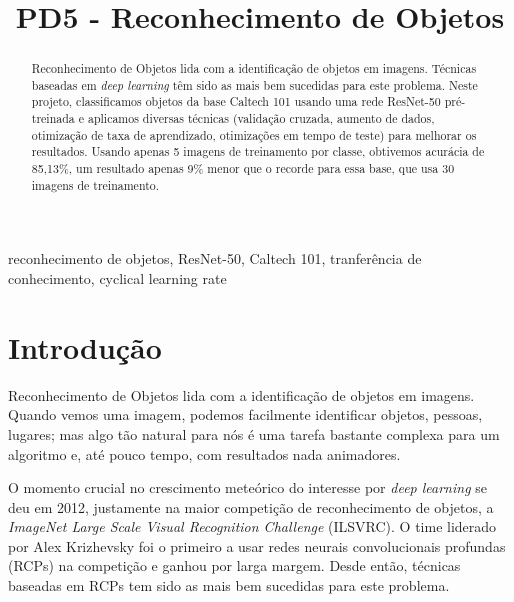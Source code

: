 \documentclass[conference]{IEEEtran}
\begin{document}
\title{PD5 - Reconhecimento de Objetos}

\author{
}

\maketitle

\begin{abstract}
Reconhecimento de Objetos lida com a identificação de objetos em imagens. Técnicas baseadas em \textit{deep learning} têm sido as mais bem sucedidas para este problema. Neste projeto, classificamos objetos da base Caltech 101\cite{caltech101} usando uma rede ResNet-50 pré-treinada e aplicamos diversas técnicas (validação cruzada, aumento de dados, otimização de taxa de aprendizado, otimizações em tempo de teste) para melhorar os resultados. Usando apenas 5 imagens de treinamento por classe, obtivemos acurácia de 85,13\%, um resultado apenas 9\% menor que o recorde para essa base, que usa 30 imagens de treinamento. 
\end{abstract}

\begin{IEEEkeywords}
reconhecimento de objetos, ResNet-50, Caltech 101, tranferência de conhecimento, cyclical learning rate
\end{IEEEkeywords}

\section{Introdução}

Reconhecimento de Objetos lida com a identificação de objetos em imagens. Quando vemos uma imagem, podemos facilmente identificar objetos, pessoas, lugares; mas algo tão natural para nós é uma tarefa bastante complexa para um algoritmo e, até pouco tempo, com resultados nada animadores.

O momento crucial no crescimento meteórico do interesse por \textit{deep learning} se deu em 2012, justamente na maior competição de reconhecimento de objetos, a  \textit{ImageNet Large Scale Visual Recognition Challenge}  (ILSVRC)\cite{goodfellow}. O time liderado por Alex Krizhevsky foi o primeiro a usar redes neurais convolucionais profundas (RCPs) na competição e ganhou por larga margem\cite{alexnet}. Desde então, técnicas baseadas em RCPs tem sido as mais bem sucedidas para este problema.
\end{document}
